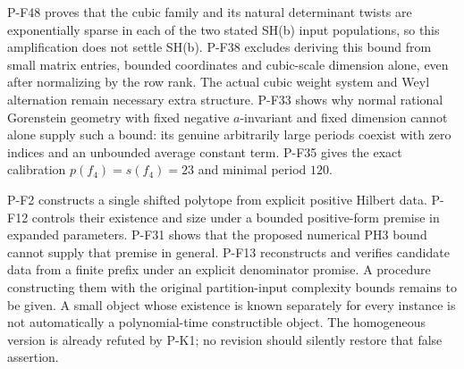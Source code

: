 \documentclass[11pt,a4paper]{article}
\begin{document}
\begin{description}
P-F48 proves that the cubic family and its natural determinant
twists are exponentially sparse in each of the two stated SH(b)
input populations, so this amplification does not settle SH(b).
P-F38 excludes deriving this bound from small matrix entries, bounded
coordinates and cubic-scale dimension alone, even after normalizing by
the row rank. The actual cubic weight system and Weyl alternation remain
necessary extra structure. P-F33 shows why normal rational Gorenstein geometry with fixed
negative $a$-invariant and fixed dimension cannot alone supply
such a bound: its genuine arbitrarily large periods coexist with
zero indices and an unbounded average constant term. P-F35 gives
the exact calibration $p(f_4)=s(f_4)=23$ and minimal period $120$.

\item[O-COUNT: uniform effective shifted counting.]
P-F2 constructs a single shifted polytope from explicit positive Hilbert
data. P-F12 controls their existence and size under a bounded
positive-form premise in expanded parameters. P-F31 shows that the
proposed numerical PH3 bound cannot supply that premise in general. P-F13 reconstructs
and verifies candidate data from a finite prefix under an explicit
denominator promise. A procedure constructing them with the original
partition-input complexity bounds remains to be given. A small object
whose existence is known separately for every instance is not automatically
a polynomial-time constructible object. The homogeneous version is already
refuted by P-K1; no revision should silently restore that false assertion.


\end{description}
\end{document}
